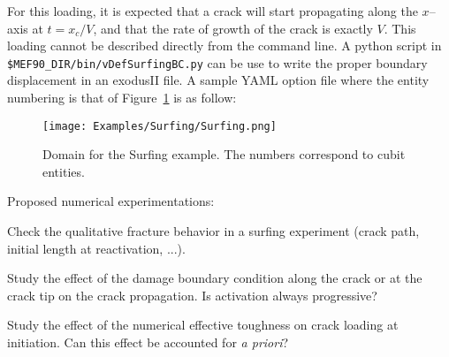 \documentclass[10pt,oneside]{memoir}
\begin{document}
For this loading, it is expected that a crack will start propagating along the $x$--axis at $t=x_c/V$, and that the rate of growth of the crack is exactly $V$.
This loading cannot be described directly from the command line. A python script in \verb+$MEF90_DIR/bin/vDefSurfingBC.py+ can be use to write the proper boundary displacement in an exodusII file. 
A sample YAML option file where the entity numbering is that of Figure~\ref{fig:Surfing} is as follow:


\begin{figure}[h]
\label{fig:Surfing}
\centering
\texttt{[image: Examples/Surfing/Surfing.png]}
\caption{Domain for the Surfing example. The numbers correspond to cubit entities.}
\end{figure}



Proposed numerical experimentations:
\begin{compactenum}
\item Check the qualitative fracture behavior in a surfing experiment (crack path, initial length at reactivation, ...).
\item Study the effect of the damage boundary condition along the crack or at the crack tip on the crack propagation. Is activation always progressive?
\item Study the effect of the numerical effective toughness on crack loading at initiation. Can this effect be accounted for \emph{a priori}?
\end{compactenum}

\end{document}
